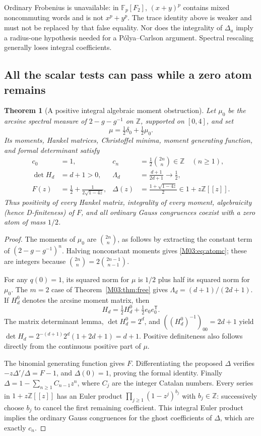 \documentclass[11pt,a4paper,oneside]{report}
\newtheorem{theorem}{Theorem}[section]
\theoremstyle{definition}
\theoremstyle{remark}
\newcommand{\Z}{\mathbb Z}
\newcommand{\F}{\mathbb F}
\begin{document}
Ordinary Frobenius is unavailable: in \(\F_p[F_2]\), \((x+y)^p\) contains mixed noncommuting words and is not \(x^p+y^p\). The trace identity above is weaker and must not be replaced by that false equality. Nor does the integrality of \(\Delta_a\) imply a radius-one hypothesis needed for a P\'olya--Carlson argument. Spectral rescaling generally loses integral coefficients.

\subsection{All the scalar tests can pass while a zero atom remains}
\begin{theorem}[A positive integral algebraic moment obstruction]\label{M03:thm:atomexample}
Let \(\mu_0\) be the arcsine spectral measure of \(2-g-g^{-1}\) on \(\Z\), supported on \([0,4]\), and set
\[
\mu=\tfrac12\delta_0+\tfrac12\mu_0.
\]
Its moments, Hankel matrices, Christoffel minima, moment generating function, and formal determinant satisfy
\begin{align}
c_0&=1,& c_n&=\tfrac12\binom{2n}{n}\in\Z\quad(n\ge1),\label{M03:eq:atomc}\\
\det H_d&=d+1>0,& \Lambda_d&=\frac{d+1}{2d+1}\longrightarrow\tfrac12,\label{M03:eq:atomH}\\
F(z)&=\tfrac12+\frac1{2\sqrt{1-4z}},&
\Delta(z)&=\frac{1+\sqrt{1-4z}}2\in1+z\Z[[z]].\label{M03:eq:atomF}
\end{align}
Thus positivity of every Hankel matrix, integrality of every moment, algebraicity (hence D-finiteness) of \(F\), and all ordinary Gauss congruences coexist with a zero atom of mass \(1/2\).
\end{theorem}
\begin{proof}
The moments of \(\mu_0\) are \(\binom{2n}{n}\), as follows by extracting the constant term of \((2-g-g^{-1})^n\). Halving nonconstant moments gives \eqref{M03:eq:atomc}; these are integers because \(\binom{2n}{n}=2\binom{2n-1}{n-1}\).

For any \(q(0)=1\), its squared norm for \(\mu\) is \(1/2\) plus half its squared norm for \(\mu_0\). The \(m=2\) case of Theorem~\ref{M03:thm:free} gives \(\Lambda_d=(d+1)/(2d+1)\). If \(H_d^0\) denotes the arcsine moment matrix, then
\[
H_d=\tfrac12H_d^0+\tfrac12 e_0e_0^{\mathsf T}.
\]
The matrix determinant lemma, \(\det H_d^0=2^d\), and \(((H_d^0)^{-1})_{00}=2d+1\) yield
\(\det H_d=2^{-(d+1)}2^d(1+2d+1)=d+1\). Positive definiteness also follows directly from the continuous positive part of \(\mu\).

The binomial generating function gives \(F\). Differentiating the proposed \(\Delta\) verifies
\(-z\Delta'/\Delta=F-1\), and \(\Delta(0)=1\), proving the formal identity. Finally
\(\Delta=1-\sum_{n\ge1}C_{n-1}z^n\), where \(C_j\) are the integer Catalan numbers. Every series in \(1+z\Z[[z]]\) has an Euler product \(\prod_{j\ge1}(1-z^j)^{b_j}\) with \(b_j\in\Z\): successively choose \(b_j\) to cancel the first remaining coefficient. This integral Euler product implies the ordinary Gauss congruences for the ghost coefficients of \(\Delta\), which are exactly \(c_n\).
\end{proof}
\end{document}
